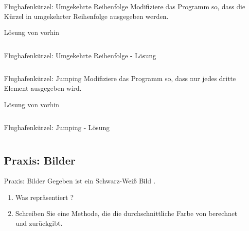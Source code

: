 \documentclass[usepdftitle=false,hyperref={pdfpagelabels=false}]{beamer}
\begin{document}
\begin{frame}{Flughafenkürzel: Umgekehrte Reihenfolge}
    Modifiziere das Programm so, dass die Kürzel in umgekehrter
    Reihenfolge ausgegeben werden.
    \begin{block}{Lösung von vorhin}
    \inputminted[linenos=true, numbersep=5pt, tabsize=4, fontsize=\tiny]{java}{IataCode.java}
    \end{block}
\end{frame}

\begin{frame}{Flughafenkürzel: Umgekehrte Reihenfolge - Lösung}
    \inputminted[linenos=true, numbersep=5pt, tabsize=4, fontsize=\small]{java}{IataCode-2.java}
\end{frame}

\begin{frame}{Flughafenkürzel: Jumping}
    Modifiziere das Programm so, dass nur jedes dritte Element
    ausgegeben wird.
    \begin{block}{Lösung von vorhin}
    \inputminted[linenos=true, numbersep=5pt, tabsize=4, fontsize=\tiny]{java}{IataCode.java}
    \end{block}
\end{frame}

\begin{frame}{Flughafenkürzel: Jumping - Lösung}
    \inputminted[linenos=true, numbersep=5pt, tabsize=4, fontsize=\small]{java}{IataCode-3.java}
\end{frame}

\subsection{Praxis: Bilder}
\begin{frame}{Praxis: Bilder}
    Gegeben ist ein Schwarz-Weiß Bild .
    \begin{enumerate}
        \item Was repräsentiert ?
        \item Schreiben Sie eine Methode, die die durchschnittliche
              Farbe von  berechnet und zurückgibt.
    \end{enumerate}
\end{frame}
\end{document}
